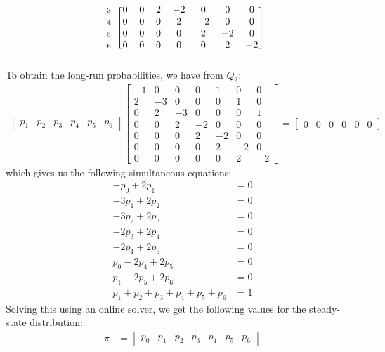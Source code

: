 \documentclass[12pt]{article}
\newcommand{\matindex}[1]{\mbox{\scriptsize#1}}%
\begin{document}
\begin{equation}
\begin{blockarray}{cccccccc}
\begin{block}{c[ccccccc]}
            \matindex{3} & 0 & 0 & 2 & -2 & 0 & 0 & 0 \\ 
            \matindex{4} & 0 & 0 & 0 & 2 & -2 & 0 & 0 \\ 
            \matindex{5} & 0 & 0 & 0 & 0 & 2 & -2 & 0 \\ 
            \matindex{6} & 0 & 0 & 0 & 0 & 0 & 2 & -2 \\ 
        \end{block}
    \end{blockarray}
\end{equation} To obtain the long-run probabilities, we have from $Q_{2}$: \begin{align*}
    \begin{bmatrix}
        p_1 & p_2 & p_3 & p_4 & p_5 & p_6
    \end{bmatrix} \begin{bmatrix}
        -1 & 0 & 0 & 0 & 1 & 0 & 0 \\ 
        2 & -3 & 0 & 0 & 0 & 1 & 0 \\ 
        0 & 2 & -3 & 0 & 0 & 0 & 1 \\ 
        0 & 0 & 2 & -2 & 0 & 0 & 0 \\ 
        0 & 0 & 0 & 2 & -2 & 0 & 0 \\ 
        0 & 0 & 0 & 0 & 2 & -2 & 0 \\ 
        0 & 0 & 0 & 0 & 0 & 2 & -2
    \end{bmatrix} = \begin{bmatrix}
        0 & 0 & 0 & 0 & 0 & 0
    \end{bmatrix}
\end{align*} which gives us the following simultaneous equations: \begin{align*}
    -p_{0} + 2 p_{1} &= 0 \\ 
    -3p_{1} + 2 p_{2} &= 0 \\ 
    -3p_{2} + 2 p_{3} &= 0 \\ 
    -2p_{3} + 2 p_{4} &= 0 \\ 
    -2p_{4} + 2 p_{5} &= 0 \\ 
    p_{0}-2p_{4} + 2 p_{5} &= 0 \\ 
    p_{1}-2p_{5} + 2 p_{6} &= 0 \\ 
    p_{1}+p_{2}+p_{3}+p_{4}+p_{5} +p_6&= 1 
\end{align*} Solving this using an online solver, we get the following values for the steady-state distribution: \begin{align*}
    \pi &= \begin{bmatrix}
        p_{0} & p_{1} & p_{2} & p_{3} & p_{4} & p_{5} & p_{6}

\end{bmatrix}
\end{align*}
\end{document}
